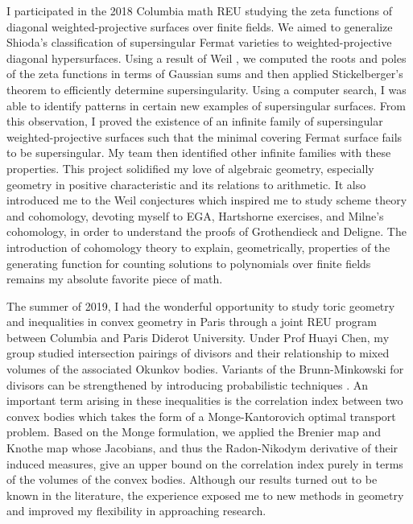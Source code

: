 \documentclass[11pt]{article}
\begin{document}
I participated in the 2018 Columbia math REU studying the zeta functions of diagonal weighted-projective surfaces over finite fields. We aimed to generalize Shioda’s classification of supersingular Fermat varieties  to weighted-projective diagonal hypersurfaces. Using a result of Weil , we computed the roots and poles of the zeta functions in terms of Gaussian sums and then applied Stickelberger's theorem to efficiently determine supersingularity. Using a computer search, I was able to identify patterns in certain new examples of supersingular surfaces. From this observation, I proved the existence of an infinite family of supersingular weighted-projective surfaces such that the minimal covering Fermat surface fails to be supersingular. My team then identified other infinite families with these properties. This project solidified my love of algebraic geometry, especially geometry in positive characteristic and its relations to arithmetic. It also introduced me to the Weil conjectures which inspired me to study scheme theory and \etale cohomology, devoting myself to EGA, Hartshorne exercises, and Milne's \etale cohomology, in order to understand the proofs of Grothendieck and Deligne. The introduction of \etale cohomology theory to explain, geometrically, properties of the generating function for counting solutions to polynomials over finite fields remains my absolute favorite piece of math. 
\par
The summer of 2019, I had the wonderful opportunity to study toric geometry and inequalities in convex geometry in Paris through a joint REU program between Columbia and Paris Diderot University. Under Prof Huayi Chen, my group studied intersection pairings of divisors and their relationship to mixed volumes of the associated Okunkov bodies. Variants of the Brunn-Minkowski for divisors can be strengthened by introducing probabilistic techniques .
An important term arising in these inequalities is the correlation index between two convex bodies which takes the form of a Monge-Kantorovich optimal transport problem. Based on the Monge formulation, we applied the Brenier map and Knothe map whose Jacobians, and thus the Radon-Nikodym derivative of their induced measures, give an upper bound on the correlation index purely in terms of the volumes of the convex bodies. Although our results turned out to be known in the literature, the experience exposed me to new methods in geometry and improved my flexibility in approaching research.
\par
\end{document}
